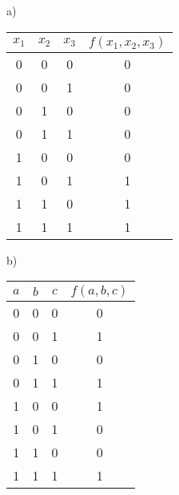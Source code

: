 \begin{minipage}[ht]{.5\linewidth}
  a)\\
  \begin{tabular}[ht]{ccc|c}
    $x_1$ & $x_2$ & $x_3$ & $f(x_1,x_2,x_3)$\\\hline
    0 & 0 & 0 & 0\\
    0 & 0 & 1 & 0\\
    0 & 1 & 0 & 0\\
    0 & 1 & 1 & 0\\
    1 & 0 & 0 & 0\\
    1 & 0 & 1 & 1\\
    1 & 1 & 0 & 1\\
    1 & 1 & 1 & 1\\
  \end{tabular}
\end{minipage}
\begin{minipage}[ht]{.5\linewidth}
  b)\\
  \begin{tabular}[ht]{ccc|c}
    $a$ & $b$ & $c$ & $f(a,b,c)$\\\hline
    0 & 0 & 0 & 0\\
    0 & 0 & 1 & 1\\
    0 & 1 & 0 & 0\\
    0 & 1 & 1 & 1\\
    1 & 0 & 0 & 1\\
    1 & 0 & 1 & 0\\
    1 & 1 & 0 & 0\\
    1 & 1 & 1 & 1\\
  \end{tabular}
\end{minipage}

\exercise\bigskip

